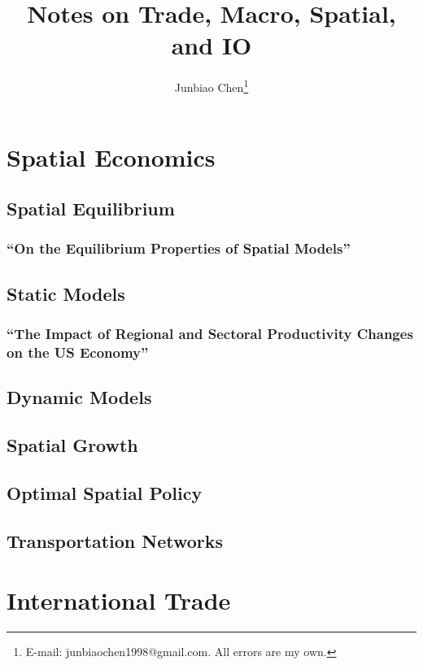 \documentclass[11pt]{report}
\title{Notes on Trade, Macro, Spatial, and IO}
\author{
Junbiao Chen\thanks{E-mail: junbiaochen1998@gmail.com.
All errors are my own.}
}
\date{}
\theoremstyle{definition}
\numberwithin{equation}{section}
\numberwithin{figure}{section}
\numberwithin{table}{section}
\begin{document}
\maketitle

\renewcommand{\thechapter}{\Alph{chapter}}
\setcounter{tocdepth}{2}
\tableofcontents
\etocsettocstyle{}{} %

\chapter{Spatial Economics}
\section{Spatial Equilibrium}
\subsection{``On the Equilibrium Properties of Spatial Models'' \\ \citep{Allen:2024}}  

\clearpage
\section{Static Models}
\subsection{``The Impact of Regional and Sectoral Productivity Changes on the US Economy'' \citep{Caliendo:2018}}
\clearpage
\section{Dynamic Models}

\section{Spatial Growth}
\section{Optimal Spatial Policy}
\section{Transportation Networks}

\chapter{International Trade}
\end{document}
